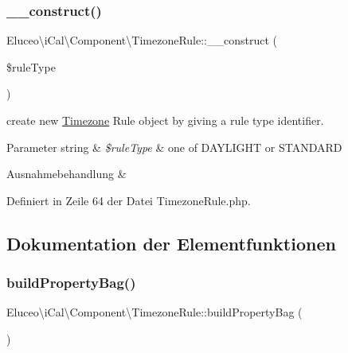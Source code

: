 \subsubsection{\texorpdfstring{\+\_\+\+\_\+construct()}{\_\_construct()}\hspace{0.1cm}{\footnotesize\ttfamily [3/3]}}
{\footnotesize\ttfamily Eluceo\textbackslash{}i\+Cal\textbackslash{}\+Component\textbackslash{}\+Timezone\+Rule\+::\+\_\+\+\_\+construct (\begin{DoxyParamCaption}\item[{}]{\$rule\+Type }\end{DoxyParamCaption})}

create new \mbox{\hyperlink{class_eluceo_1_1i_cal_1_1_component_1_1_timezone}{Timezone}} Rule object by giving a rule type identifier.


\begin{DoxyParams}[1]{Parameter}
string & {\em \$rule\+Type} & one of D\+A\+Y\+L\+I\+G\+HT or S\+T\+A\+N\+D\+A\+RD\\
\hline
\end{DoxyParams}

\begin{DoxyExceptions}{Ausnahmebehandlung}
{\em } & \\
\hline
\end{DoxyExceptions}


Definiert in Zeile 64 der Datei Timezone\+Rule.\+php.



\subsection{Dokumentation der Elementfunktionen}
\mbox{\label{class_eluceo_1_1i_cal_1_1_component_1_1_timezone_rule_a35528a86b1fe5e3640d7964cfe46c201}} 
\subsubsection{\texorpdfstring{build\+Property\+Bag()}{buildPropertyBag()}\hspace{0.1cm}{\footnotesize\ttfamily [1/3]}}
{\footnotesize\ttfamily Eluceo\textbackslash{}i\+Cal\textbackslash{}\+Component\textbackslash{}\+Timezone\+Rule\+::build\+Property\+Bag (\begin{DoxyParamCaption}{ }\end{DoxyParamCaption})}

